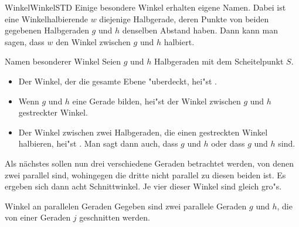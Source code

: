 \begin{MXContent}{Winkel}{Winkel}{STD}
Einige besondere Winkel erhalten eigene Namen.
Dabei ist eine Winkelhalbierende $w$ diejenige Halbgerade, deren Punkte von 
beiden gegebenen Halbgeraden $g$ und $h$ denselben Abstand haben. Dann kann 
man sagen, dass $w$ den Winkel zwischen $g$ und $h$ halbiert.

\begin{MXInfo}{Namen besonderer Winkel}
Seien $g$ und $h$ Halbgeraden mit dem Scheitelpunkt $S$.
\begin{itemize}
\item
Der Winkel, der die gesamte Ebene "uberdeckt, hei"st 
.
\item
Wenn $g$ und $h$ eine Gerade bilden, hei"st der Winkel zwischen $g$ und $h$
gestreckter Winkel.
\item
Der Winkel zwischen zwei Halbgeraden, die einen gestreckten Winkel halbieren,
hei"st . 
Man sagt dann auch, dass $g$ und $h$ 
 oder dass 
$g$ und $h$  sind. 
\end{itemize}
\end{MXInfo}

Als n\"achstes sollen nun drei verschiedene Geraden betrachtet werden, 
von denen zwei parallel sind, wohingegen die dritte nicht parallel zu diesen 
beiden ist. Es ergeben sich dann acht Schnittwinkel.
Je vier dieser Winkel sind gleich gro"s.

\begin{MXInfo}{Winkel an parallelen Geraden}%
%
Gegeben sind zwei parallele Geraden $g$ und $h$, die von einer Geraden $j$ 
geschnitten werden.


\end{MXInfo}
\end{MXContent}

